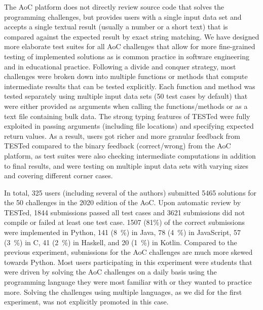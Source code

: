 \documentclass[../main]{subfiles}
\begin{document}
The AoC platform does not directly review source code that solves the programming challenges, but provides users with a single input data set and accepts a single textual result (usually a number or a short text) that is compared against the expected result by exact string matching.
We have designed more elaborate test suites for all AoC challenges that allow for more fine-grained testing of implemented solutions as is common practice in software engineering and in educational practice.
Following a divide and conquer strategy, most challenges were broken down into multiple functions or methods that compute intermediate results that can be tested explicitly.
Each function and method was tested separately using multiple input data sets (50 test cases by default) that were either provided as arguments when calling the functions/methods or as a text file containing bulk data.
The strong typing features of TESTed were fully exploited in passing arguments (including file locations) and specifying expected return values.
As a result, users got richer and more granular feedback from TESTed compared to the binary feedback (correct/wrong) from the AoC platform, as test suites were also checking intermediate computations in addition to final results, and were testing on multiple input data sets with varying sizes and covering different corner cases.

In total, \num{325} users (including several of the authors) submitted \num{5465} solutions for the \num{50} challenges in the 2020 edition of the AoC. Upon automatic review by TESTed, \num{1844} submissions passed all test cases and \num{3621} submissions did not compile or failed at least one test case.
\num{1507} (81\%) of the correct submissions were implemented in Python, \num{141} (\qty{8}{\percent}) in Java, \num{78} (\qty{4}{\percent}) in JavaScript, \num{57} (\qty{3}{\percent}) in C, \num{41} (\qty{2}{\percent}) in Haskell, and \num{20} (\qty{1}{\percent}) in Kotlin.
Compared to the previous experiment, submissions for the AoC challenges are much more skewed towards Python.
Most users participating in this experiment were students that were driven by solving the AoC challenges on a daily basis using the programming language they were most familiar with or they wanted to practice more.
Solving the challenges using multiple languages, as we did for the first experiment, was not explicitly promoted in this case.
\end{document}
